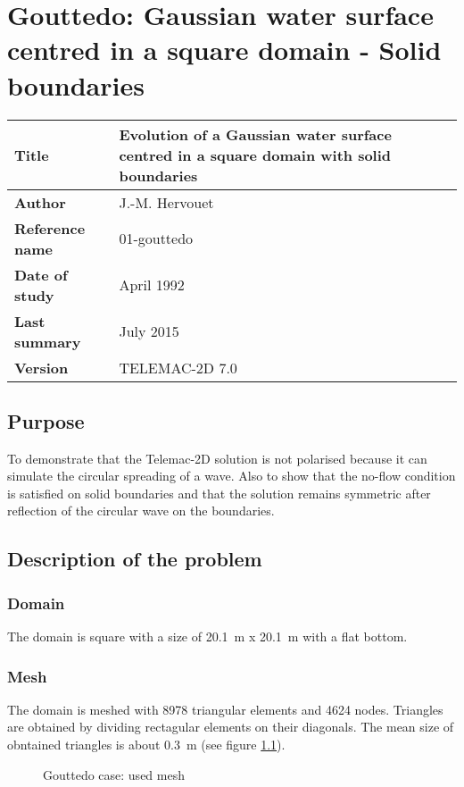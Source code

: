 \chapter{Gouttedo: Gaussian water surface centred in a square domain - Solid boundaries}
%
\begin{tabular}{|p{1.5in}|p{2.5in}|} \hline
\textbf{Title} & Evolution of a Gaussian water surface centred in a square domain with solid boundaries \\ \hline
\textbf{Author} & J.-M. Hervouet \\ \hline
\textbf{Reference name} & 01-gouttedo \\ \hline
\textbf{Date of study} & April 1992 \\ \hline
\textbf{Last summary} & July 2015 \\ \hline
\textbf{Version} & TELEMAC-2D 7.0 \\ \hline
\end{tabular}


%
\section{Purpose}
%
To demonstrate that the Telemac-2D solution is not polarised because it can simulate the circular spreading of a wave. Also to show that the no-flow condition is satisfied on solid boundaries and that the solution remains symmetric after reflection of the circular wave on the boundaries.

%
\section{Description of the problem}
%
\subsection{Domain}
The domain is square with a size of  20.1~m x 20.1~m with a flat bottom. 
\subsection{Mesh}
The domain is meshed with 8978 triangular elements and 4624 nodes. Triangles are obtained by dividing rectagular elements on their diagonals. The mean size of obntained triangles is about 0.3~m (see figure \ref{fig:gouttedo_mesh}). 
\begin{figure}[h]
\begin{center}
\end{center}
\caption{Gouttedo case: used mesh}
\label{fig:gouttedo_mesh}
\end{figure}

